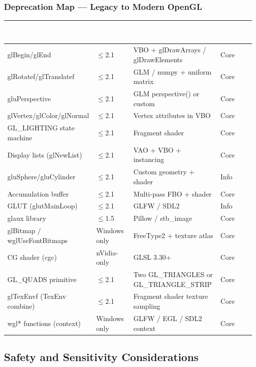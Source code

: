 \documentclass[11pt,letterpaper]{article}
\newcommand{\tableheader}[1]{\textbf{\sffamily\textcolor{white}{#1}}}
\begin{document}
\subsubsection{Deprecation Map --- Legacy to Modern OpenGL}

\begin{center}
\begin{tabularx}{\textwidth}{L{3.5cm}L{2.5cm}XL{1.8cm}}
\toprule
{}
\tableheader{Legacy Pattern} & \tableheader{OpenGL Version} & \tableheader{Modern Equivalent} & \tableheader{Severity} \\
\midrule
glBegin/glEnd & $\leq$2.1 & VBO + glDrawArrays / glDrawElements & Core \\
glRotatef/glTranslatef & $\leq$2.1 & GLM / numpy + uniform matrix & Core \\
gluPerspective & $\leq$2.1 & GLM perspective() or custom & Core \\
glVertex/glColor/glNormal & $\leq$2.1 & Vertex attributes in VBO & Core \\
GL\_LIGHTING state machine & $\leq$2.1 & Fragment shader & Core \\
Display lists (glNewList) & $\leq$2.1 & VAO + VBO + instancing & Core \\
gluSphere/gluCylinder & $\leq$2.1 & Custom geometry + shader & Info \\
Accumulation buffer & $\leq$2.1 & Multi-pass FBO + shader & Core \\
GLUT (glutMainLoop) & $\leq$2.1 & GLFW / SDL2 & Info \\
glaux library & $\leq$1.5 & Pillow / stb\_image & Core \\
glBitmap / wglUseFontBitmaps & Windows only & FreeType2 + texture atlas & Core \\
CG shader (cgc) & nVidia-only & GLSL 3.30+ & Core \\
GL\_QUADS primitive & $\leq$2.1 & Two GL\_TRIANGLES or GL\_TRIANGLE\_STRIP & Core \\
glTexEnvf (TexEnv combine) & $\leq$2.1 & Fragment shader texture sampling & Core \\
wgl* functions (context) & Windows only & GLFW / EGL / SDL2 context & Core \\
\bottomrule
\end{tabularx}
\end{center}

\subsection{Safety and Sensitivity Considerations}
\end{document}
